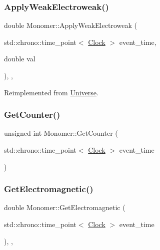 \subsubsection{\texorpdfstring{Apply\+Weak\+Electroweak()}{ApplyWeakElectroweak()}}
{\footnotesize\ttfamily double Monomer\+::\+Apply\+Weak\+Electroweak (\begin{DoxyParamCaption}\item[{std\+::chrono\+::time\+\_\+point$<$ \mbox{\hyperlink{universe_8h_a0ef8d951d1ca5ab3cfaf7ab4c7a6fd80}{Clock}} $>$}]{event\+\_\+time,  }\item[{double}]{val }\end{DoxyParamCaption})\hspace{0.3cm}{\ttfamily [inline]}, {\ttfamily [final]}, {\ttfamily [virtual]}}



Reimplemented from \mbox{\hyperlink{classUniverse_a46a906baabb63e5d31f8b48ea1fae52e}{Universe}}.

\mbox{\label{classMonomer_a4651a4bd0a41d0698821421043e41126}} 
\subsubsection{\texorpdfstring{Get\+Counter()}{GetCounter()}}
{\footnotesize\ttfamily unsigned int Monomer\+::\+Get\+Counter (\begin{DoxyParamCaption}\item[{std\+::chrono\+::time\+\_\+point$<$ \mbox{\hyperlink{universe_8h_a0ef8d951d1ca5ab3cfaf7ab4c7a6fd80}{Clock}} $>$}]{event\+\_\+time }\end{DoxyParamCaption})}

\mbox{\label{classMonomer_ad23f4829d66cb20401cc72a9d72ac320}} 
\subsubsection{\texorpdfstring{Get\+Electromagnetic()}{GetElectromagnetic()}}
{\footnotesize\ttfamily double Monomer\+::\+Get\+Electromagnetic (\begin{DoxyParamCaption}\item[{std\+::chrono\+::time\+\_\+point$<$ \mbox{\hyperlink{universe_8h_a0ef8d951d1ca5ab3cfaf7ab4c7a6fd80}{Clock}} $>$}]{event\+\_\+time }\end{DoxyParamCaption})\hspace{0.3cm}{\ttfamily [inline]}, {\ttfamily [final]}, {\ttfamily [virtual]}}



